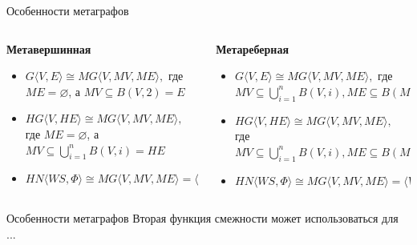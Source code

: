 \documentclass{beamer}
\begin{document}
\begin{darkframes}
\begin{frame}[label=lists]{Особенности метаграфов}
	 	\vspace*{0.7cm}
			\begin{columns}[onlytextwidth]
			\begin{column}{0.48\columnwidth}
			\centering
			\textbf{Метавершинная}
				\begin{itemize}
					\item \scriptsize{$G\langle V, E \rangle \cong MG\langle V, MV, ME \rangle,$ где $ME =\varnothing$, а $MV \subseteq B(V, 2) = E$ }
					\item \scriptsize{$HG\langle V, HE \rangle \cong MG\langle V, MV, ME \rangle,$ где $ME =\varnothing$, а $MV \subseteq \bigcup \limits_{i=1}^{n}B(V, i) = HE$}
					\item \scriptsize{$HN \langle WS, \Phi \rangle \cong MG\langle V, MV, ME \rangle = \Big\langle V, \{WS_i\},  \big\langle ..., \langle WS_i , WS_{i-1}\rangle, ...  \big\rangle \Big\rangle$}
				\end{itemize}
			\end{column}

			\begin{column}{0.48\columnwidth}
			\centering
			\textbf{Метареберная}
				\begin{itemize}
					\item \scriptsize{$G\langle V, E \rangle \cong MG\langle V, MV, ME \rangle,$ где $MV \subseteq \bigcup \limits_{i=1}^{n}B(V, i), ME \subseteq B(MV,2)$}
					\item \scriptsize{$HG\langle V, HE \rangle \cong MG\langle V, MV, ME \rangle,$ где  $MV \subseteq \bigcup \limits_{i=1}^{n}B(V, i), ME \subseteq B(MV,2)$}
					\item \scriptsize{$HN \langle WS, \Phi \rangle \cong MG\langle V, MV, ME \rangle = \Big\langle V, \{WS_i\},  \big\langle ..., \langle WS_i , WS_{i-1}\rangle, ...  \big\rangle \Big\rangle$}
				\end{itemize}
			\end{column}
			\end{columns}
	\end{frame}

	\begin{frame}[label=lists]{Особенности метаграфов}
	\centering 
		Вторая функция смежности может использоваться для ...\smallskip


\end{frame}
\end{darkframes}
\end{document}
